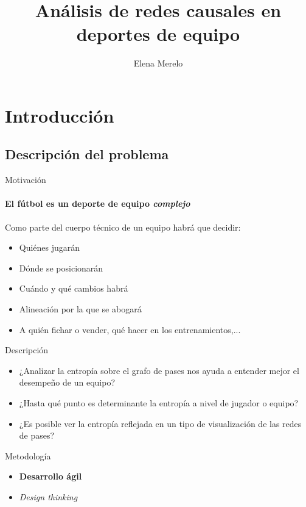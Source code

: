 \documentclass{beamer}
\title[Análisis de redes causales en deportes de equipo]{Análisis de redes causales en deportes de equipo}
\author[E. Merelo]{Elena Merelo}
\begin{document}
	\typesetFrontSlides


\section{Introducción}

\subsection[Problema]{Descripción del problema}

\begin{frame}{Motivación}
	\framesubtitle{El fútbol es un deporte de equipo \textit{complejo}}
    Como parte del cuerpo técnico de un equipo habrá que decidir:
    \begin{itemize}
		\item Quiénes jugarán
		\pause
		\item Dónde se posicionarán
		\pause
        \item Cuándo y qué cambios habrá
		\pause
        \item Alineación por la que se abogará
        \pause
        \item A quién fichar o vender, qué hacer en los entrenamientos,... 
	\end{itemize}
\end{frame}

\begin{frame}{Descripción}
	\begin{itemize}
		\item <1->¿Analizar la entropía sobre el grafo de pases nos ayuda a entender mejor el desempeño de un equipo?
		\item <2->¿Hasta qué punto es determinante la entropía a nivel de jugador o equipo?
        \item <3->¿Es posible ver la entropía reflejada en un tipo de visualización de las redes de pases?
	\end{itemize}
\end{frame}

\begin{frame}{Metodología}
	\begin{itemize}
		\item \textbf{Desarrollo ágil}
		\pause
		\item \textit{Design thinking}
	\end{itemize}
\end{frame}
\end{document}
